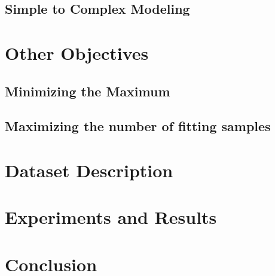 \documentclass[a4paper,12pt]{article}
\begin{document}
\subsection{Simple to Complex Modeling}

\section{Other Objectives}
\label{sec-other-objectives}

\subsection{Minimizing the Maximum}
\subsection{Maximizing the number of fitting samples}

\section{Dataset Description}
\label{sec-dataset}

\section{Experiments and Results}
\label{sec-experiment}

\section{Conclusion}
\label{sec-conclusion}
\end{document}
